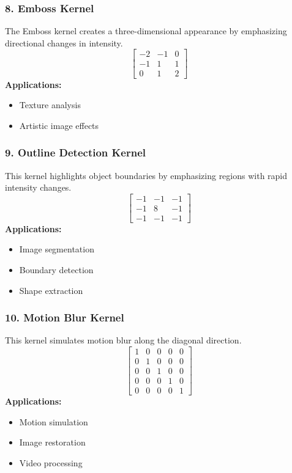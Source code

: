 \documentclass[11pt]{article}
\begin{document}
\subsubsection*{8. Emboss Kernel}
The Emboss kernel creates a three-dimensional appearance by emphasizing directional changes in intensity. 
$$ \begin{bmatrix} -2 & -1 & 0 \\ -1 & 1 & 1 \\ 0 & 1 & 2 \end{bmatrix} $$
\textbf{Applications:}
\begin{itemize}
    \item Texture analysis 
    \item Artistic image effects 
\end{itemize}

\subsubsection*{9. Outline Detection Kernel}
This kernel highlights object boundaries by emphasizing regions with rapid intensity changes. 
$$ \begin{bmatrix} -1 & -1 & -1 \\ -1 & 8 & -1 \\ -1 & -1 & -1 \end{bmatrix} $$
\textbf{Applications:}
\begin{itemize}
    \item Image segmentation 
    \item Boundary detection 
    \item Shape extraction 
\end{itemize}

\subsubsection*{10. Motion Blur Kernel}
This kernel simulates motion blur along the diagonal direction. 
$$ \begin{bmatrix} 1 & 0 & 0 & 0 & 0 \\ 0 & 1 & 0 & 0 & 0 \\ 0 & 0 & 1 & 0 & 0 \\ 0 & 0 & 0 & 1 & 0 \\ 0 & 0 & 0 & 0 & 1 \end{bmatrix} $$
\textbf{Applications:}
\begin{itemize}
    \item Motion simulation 
    \item Image restoration 
    \item Video processing 
\end{itemize}
\end{document}
